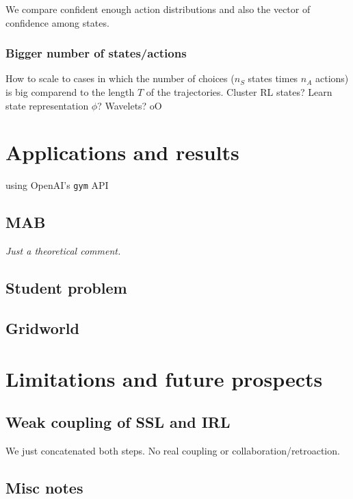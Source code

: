 \documentclass{article}
\begin{document}
We compare confident enough action distributions and also the vector of confidence among states.

\subsubsection{Bigger number of states/actions}

How to scale to cases in which the number of choices ($n_S$ states times $n_A$ actions) is big comparend to the length $T$ of the trajectories. Cluster RL states? Learn state representation $\phi$? Wavelets? oO


\section{Applications and results \label{sec:results}}

using OpenAI's \verb|gym| API

\subsection{MAB}

\emph{Just a theoretical comment.}

\subsection{Student problem}

\subsection{Gridworld}



\section{Limitations and future prospects \label{sec:limitations}}


\subsection{Weak coupling of SSL and IRL}

We just concatenated both steps. No real coupling or collaboration/retroaction.

\subsection{Misc notes}
\end{document}
